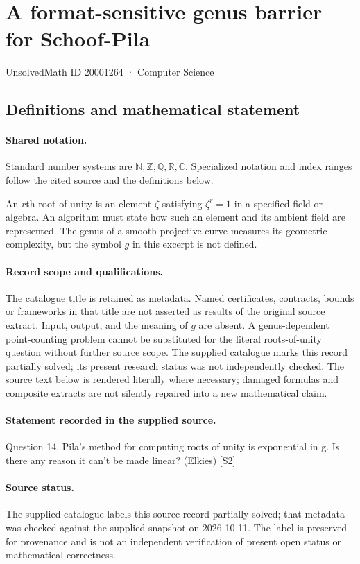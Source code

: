 \documentclass[11pt]{article}
\newcommand{\sref}[2]{\hyperlink{source:#1:#2}{[S#2]}}
\begin{document}
\setcounter{section}{20001263}
\section{A format-sensitive genus barrier for Schoof-Pila}\label{20001264}
{\small\sffamily UnsolvedMath ID 20001264 · Computer Science}
\subsection{Definitions and mathematical statement}

\paragraph{Shared notation.}Standard number systems are $\mathbb N,\mathbb Z,\mathbb Q,\mathbb R,\mathbb C$. Specialized notation and index ranges follow the cited source and the definitions below.


An $r$th root of unity is an element $\zeta$ satisfying $\zeta^r=1$ in a specified field or algebra. An algorithm must state how such an element and its ambient field are represented. The genus of a smooth projective curve measures its geometric complexity, but the symbol $g$ in this excerpt is not defined.
\paragraph{Record scope and qualifications.}
The catalogue title is retained as metadata. Named certificates, contracts, bounds or frameworks in that title are not asserted as results of the original source extract.
Input, output, and the meaning of $g$ are absent. A genus-dependent point-counting problem cannot be substituted for the literal roots-of-unity question without further source scope. The supplied catalogue marks this record partially solved; its present research status was not independently checked.
The source text below is rendered literally where necessary; damaged formulas and composite extracts are not silently repaired into a new mathematical claim.
\paragraph{Statement recorded in the supplied source.}
Question 14. Pila's method for computing roots of unity is exponential in g. Is there any reason it can't be made linear? (Elkies) \sref{20001264}{2}
\paragraph{Source status.}
The supplied catalogue labels this source record partially solved; that metadata was checked against the supplied snapshot on 2026-10-11. The label is preserved for provenance and is not an independent verification of present open status or mathematical correctness.
\end{document}
